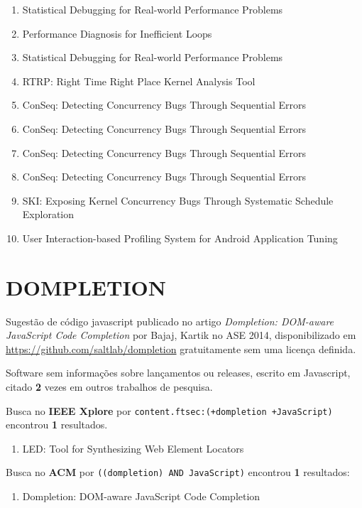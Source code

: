 \begin{enumerate}
\item Statistical Debugging for Real-world Performance Problems
\item Performance Diagnosis for Inefficient Loops
\item Statistical Debugging for Real-world Performance Problems
\item RTRP: Right Time Right Place Kernel Analysis Tool
\item ConSeq: Detecting Concurrency Bugs Through Sequential Errors
\item ConSeq: Detecting Concurrency Bugs Through Sequential Errors
\item ConSeq: Detecting Concurrency Bugs Through Sequential Errors
\item ConSeq: Detecting Concurrency Bugs Through Sequential Errors
\item SKI: Exposing Kernel Concurrency Bugs Through Systematic Schedule Exploration
\item User Interaction-based Profiling System for Android Application Tuning
\end{enumerate}

\section{DOMPLETION}

Sugestão de código javascript
publicado no artigo {\it Dompletion: DOM-aware JavaScript Code Completion}
por Bajaj, Kartik
no ASE 2014,
disponibilizado em \url{https://github.com/saltlab/dompletion}
gratuitamente
sem uma licença definida.

Software sem informações sobre lançamentos ou releases,
escrito em Javascript,
citado {\bf 2} vezes em outros trabalhos de pesquisa.

Busca no {\bf IEEE Xplore} por
\texttt{content.ftsec:(+dompletion +JavaScript)}
encontrou {\bf 1}
resultados.

\begin{enumerate}
\item LED: Tool for Synthesizing Web Element Locators
\end{enumerate}

Busca no {\bf ACM} por
\texttt{((dompletion) AND JavaScript)}
encontrou {\bf 1}
resultados:

\begin{enumerate}
\item Dompletion: DOM-aware JavaScript Code Completion
\end{enumerate}

